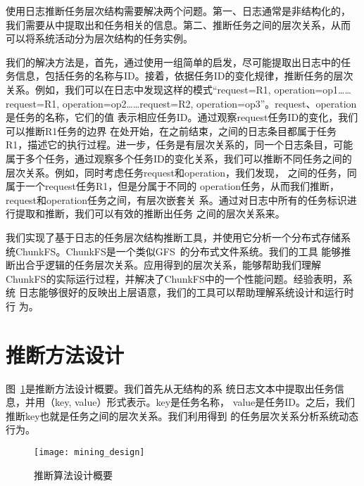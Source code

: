 
使用日志推断任务层次结构需要解决两个问题。第一、日志通常是非结构化的，
我们需要从中提取出和任务相关的信息。第二、推断任务之间的层次关系，从而
可以将系统活动分为层次结构的任务实例。

我们的解决方法是，首先，通过使用一组简单的启发，尽可能提取出日志中的任
务信息，包括任务的名称与ID。接着，依据任务ID的变化规律，推断任务的层次
关系。例如，我们可以在日志中发现这样的模式“request=R1,
operation=op1\ldots \ldots request=R1,
operation=op2\ldots \ldots request=R2,
operation=op3”。request、operation是任务的名称，它们的值
表示相应任务ID。通过观察request任务ID的变化，我们可以推断R1任务的边界
在处开始，在之前结束，之间的日志条目都属于任务
R1，描述它的执行过程。进一步，任务是有层次关系的，同一个日志条目，可能
属于多个任务，通过观察多个任务ID的变化关系，我们可以推断不同任务之间的
层次关系。例如，同时考虑任务request和operation，我们发现，
之间的任务，同属于一个request任务R1，但是分属于不同的
operation任务，从而我们推断，request和operation任务之间，有层次嵌套关
系。通过对日志中所有的任务标识进行提取和推断，我们可以有效的推断出任务
之间的层次关系来。

我们实现了基于日志的任务层次结构推断工具，并使用它分析一个分布式存储系
统ChunkFS。ChunkFS是一个类似GFS~\cite{gfs}的分布式文件系统。我们的工具
能够推断出合乎逻辑的任务层次关系。应用得到的层次关系，能够帮助我们理解
ChunkFS的实际运行过程，并解决了ChunkFS中的一个性能问题。经验表明，系统
日志能够很好的反映出上层语意，我们的工具可以帮助理解系统设计和运行时行
为。


\section{推断方法设计}
\label{sec:lm_design}

图~\ref{fig:logmining_design}是推断方法设计概要。我们首先从无结构的系
统日志文本中提取出任务信息，并用（key, value）形式表示。key是任务名称，
value是任务ID。之后，我们推断key也就是任务之间的层次关系。我们利用得到
的任务层次关系分析系统动态行为。


\begin{figure}
  \centering
  \begin{minipage}{0.8\linewidth}
    \centering
    \texttt{[image: mining\_design]}
    \caption{推断算法设计概要}
    \label{fig:logmining_design}
  \end{minipage}
\end{figure}

